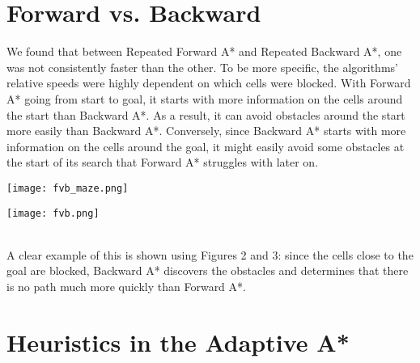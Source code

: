 \documentclass{article}
\begin{document}
\section{Forward vs. Backward}
We found that between Repeated Forward A* and Repeated Backward A*, one was not consistently faster than the other. To be more specific, the algorithms' relative speeds were highly dependent on which cells were blocked. With Forward A* going from start to goal, it starts with more information on the cells around the start than Backward A*. As a result, it can avoid obstacles around the start more easily than Backward A*. Conversely, since Backward A* starts with more information on the cells around the goal, it might easily avoid some obstacles at the start of its search that Forward A* struggles with later on.\\
\begin{minipage}[t]{\linewidth}
    \centering
    \texttt{[image: fvb\_maze.png]}
\end{minipage}
\begin{minipage}[t]{\linewidth}
    \centering
    \texttt{[image: fvb.png]}
\end{minipage}\bigskip\\
A clear example of this is shown using Figures 2 and 3: since the cells close to the goal are blocked, Backward A* discovers the obstacles and determines that there is no path much more quickly than Forward A*.

\section{Heuristics in the Adaptive A*}
\end{document}
